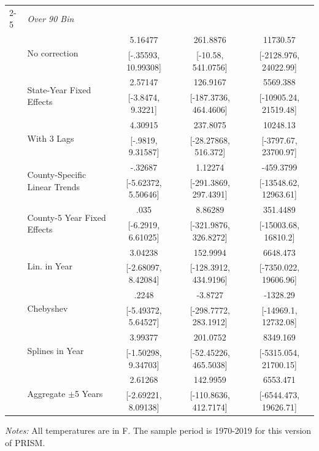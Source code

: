 \begin{table}[htb]
\begin{threeparttable}
{\begin{tabular}{llccc}
\cmidrule(lr){2-5}  & \textit{Over 90 Bin} \\
 & \multirow{2}{*}{No correction} & 5.16477 & 261.8876 & 11730.57 \\  & & [-.35593, 10.99308] & [-10.58, 541.0756] & [-2128.976, 24022.99] \\ & \multirow{2}{*}{State-Year Fixed Effects} & 2.57147 & 126.9167 & 5569.388 \\  & & [-3.8474, 9.3221] & [-187.3736, 464.4606] & [-10905.24, 21519.48] \\ & \multirow{2}{*}{With 3 Lags} & 4.30915 & 237.8075 & 10248.13 \\  & & [-.9819, 9.31587] & [-28.27868, 516.372] & [-3797.67, 23700.97] \\ & \multirow{2}{*}{County-Specific Linear Trends} & -.32687 & 1.12274 & -459.3799 \\  & & [-5.62372, 5.50646] & [-291.3869, 297.4391] & [-13548.62, 12963.61] \\ & \multirow{2}{*}{County-5 Year Fixed Effects} & .035 & 8.86289 & 351.4489 \\  & & [-6.2919, 6.61025] & [-321.9876, 326.8272] & [-15003.68, 16810.2] \\ & \multirow{2}{*}{Lin. in Year} & 3.04238 & 152.9994 & 6648.473 \\  & & [-2.68097, 8.42084] & [-128.3912, 434.9196] & [-7350.022, 19606.96] \\ & \multirow{2}{*}{Chebyshev} & .2248 & -3.8727 & -1328.29 \\  & & [-5.49372, 5.64527] & [-298.7772, 283.1912] & [-14969.1, 12732.08] \\ & \multirow{2}{*}{Splines in Year} & 3.99377 & 201.0752 & 8349.169 \\  & & [-1.50298, 9.34703] & [-52.45226, 465.5038] & [-5315.054, 21700.15] \\ & \multirow{2}{*}{Aggregate \(\pm\)5 Years} & 2.61268 & 142.9959 & 6553.471 \\  & & [-2.69221, 8.09138] & [-110.8636, 412.7174] & [-6544.473, 19626.71] \\
\hline \hline
\end{tabular}
}
\begin{tablenotes}
\footnotesize \textit{Notes:} All temperatures are in \degree F. The sample period is 1970-2019 for this version of PRISM.
\end{tablenotes}
\end{threeparttable}
\end{table}
